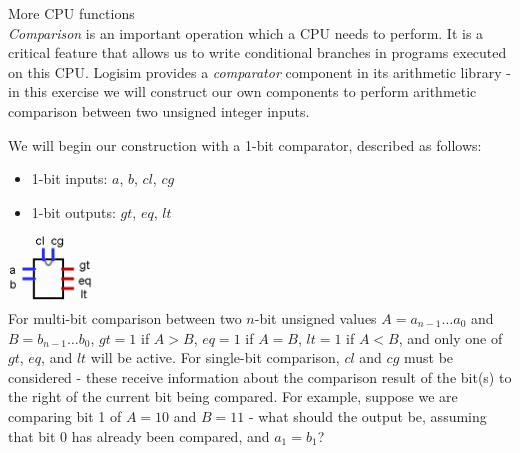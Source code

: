 \item[17] More CPU functions \\
\textit{Comparison} is an important operation which a CPU needs to perform. It is a critical feature that allows us to write conditional branches in programs executed on this CPU. Logisim provides a \textit{comparator} component in its arithmetic library - in this exercise we will construct our own components to perform arithmetic comparison between two unsigned integer inputs.

  We will begin our construction with a 1-bit comparator, described as follows: \\

     \begin{itemize}
      \item 1-bit inputs: $a$, $b$, $cl$, $cg$
      \item 1-bit outputs: $gt$, $eq$, $lt$
     \end{itemize}
     \includegraphics[height=1.8cm]{compare-1-pkg.png} \\

    For multi-bit comparison between two $n$-bit unsigned values $A=a_{n-1}\ldots a_{0}$ and $B=b_{n-1}\ldots b_{0}$, $gt=1$ if $A>B$, $eq=1$ if $A=B$, $lt=1$ if $A<B$, and only one of $gt$, $eq$, and $lt$ will be active. For single-bit comparison, $cl$ and $cg$ must be considered - these receive information about the comparison result of the bit(s) to the right of the current bit being compared. For example, suppose we are comparing bit 1 of $A=10$ and $B=11$ - what should the output be, assuming that bit 0 has already been compared, and $a_1=b_1$?

